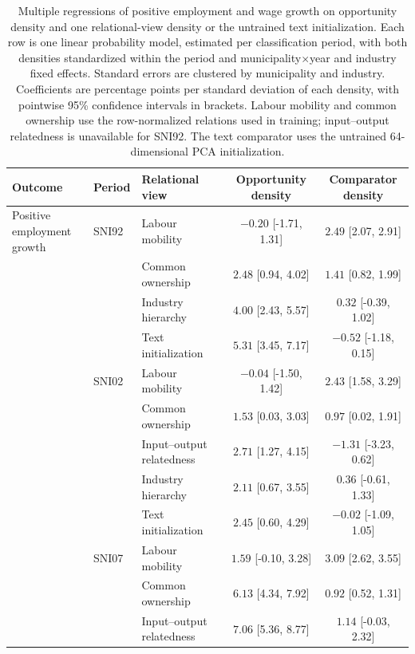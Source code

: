 \documentclass[9pt,twoside]{pnas-new}
\begin{document}
\clearpage
\begin{table}[H]
\centering
\scriptsize
\setlength{\tabcolsep}{4pt}
\caption{Multiple regressions of positive employment and wage growth on opportunity density and one relational-view density or the untrained text initialization. Each row is one linear probability model, estimated per classification period, with both densities standardized within the period and municipality$\times$year and industry fixed effects. Standard errors are clustered by municipality and industry. Coefficients are percentage points per standard deviation of each density, with pointwise 95\% confidence intervals in brackets. Labour mobility and common ownership use the row-normalized relations used in training; input--output relatedness is unavailable for SNI92. The text comparator uses the untrained 64-dimensional PCA initialization.}
\label{tab:multiple_regression_growth}
\begin{tabular}{lllcc}
\toprule
Outcome & Period & Relational view & Opportunity density & Comparator density \\
\midrule
\shortstack[l]{Positive employment\\growth} & SNI92 & Labour mobility & $-0.20$ [-1.71, 1.31] & $2.49$ [2.07, 2.91] \\
 &  & Common ownership & $2.48$ [0.94, 4.02] & $1.41$ [0.82, 1.99] \\
 &  & Industry hierarchy & $4.00$ [2.43, 5.57] & $0.32$ [-0.39, 1.02] \\
 &  & Text initialization & $5.31$ [3.45, 7.17] & $-0.52$ [-1.18, 0.15] \\
\addlinespace[2pt]
 & SNI02 & Labour mobility & $-0.04$ [-1.50, 1.42] & $2.43$ [1.58, 3.29] \\
 &  & Common ownership & $1.53$ [0.03, 3.03] & $0.97$ [0.02, 1.91] \\
 &  & Input--output relatedness & $2.71$ [1.27, 4.15] & $-1.31$ [-3.23, 0.62] \\
 &  & Industry hierarchy & $2.11$ [0.67, 3.55] & $0.36$ [-0.61, 1.33] \\
 &  & Text initialization & $2.45$ [0.60, 4.29] & $-0.02$ [-1.09, 1.05] \\
\addlinespace[2pt]
 & SNI07 & Labour mobility & $1.59$ [-0.10, 3.28] & $3.09$ [2.62, 3.55] \\
 &  & Common ownership & $6.13$ [4.34, 7.92] & $0.92$ [0.52, 1.31] \\
 &  & Input--output relatedness & $7.06$ [5.36, 8.77] & $1.14$ [-0.03, 2.32] \\

\end{tabular}
\end{table}
\end{document}

